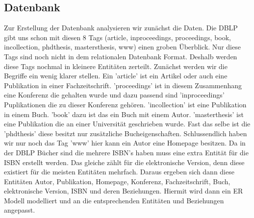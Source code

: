\subsection{Datenbank}
Zur Erstellung der Datenbank analysieren wir zunächst die Daten. Die DBLP gibt uns schon mit diesen 8 Tags (article, inproceedings, proceedings, book, incollection, phdthesis, mastersthesis, www) einen groben Überblick. Nur diese Tags sind noch nicht in dem relationalen Datenbank Format. Deshalb werden diese Tags nochmal in kleinere Entitäten zerteilt. Zunächst werden wir die Begriffe ein wenig klarer stellen. Ein 'article' ist ein Artikel oder auch eine Publikation in einer Fachzeitschrift. 'proceedings' ist in diesem Zusammenhang eine Konferenz die gehalten wurde und dazu passend sind 'inproceedings' Puplikationen die zu dieser Konferenz gehören. 'incollection' ist eine Publikation in einem Buch. 'book' dazu ist das ein Buch mit einem Autor. 'masterthesis' ist eine Publikation die an einer Universität geschrieben wurde. Fast das selbe ist die 'phdthesis' diese besitzt nur zusätzliche Bucheigenschaften. Schlussendlich haben wir nur noch das Tag 'www' hier kann ein Autor eine Homepage besitzen. Da in der DBLP Bücher sind die mehrere ISBN's haben muss eine extra Entität für die ISBN erstellt werden. Das gleiche zählt für die elektronische Version, denn diese existiert für die meisten Entitäten mehrfach. Daraus ergeben sich dann diese Entitäten Autor, Publikation, Homepage, Konferenz, Fachzeitschrift, Buch, elektronische Version, ISBN und deren Beziehungen. Hiermit wird dann ein ER Modell modelliert und an die entsprechenden Entitäten und Beziehungen angepasst. 

